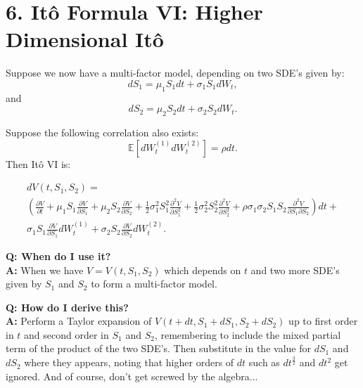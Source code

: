 \documentclass[11pt]{article}
\begin{document}
\newpage


\section*{6. Itô Formula VI: Higher Dimensional Itô}
Suppose we now have a multi-factor model, depending on two SDE's given by:
\begin{equation*}
        dS_1 = \mu_1 S_1 dt + \sigma_1 S_1 dW_t,
\end{equation*}
and
\begin{equation*}
        dS_2 = \mu_2 S_2 dt + \sigma_2 S_2 dW_t.
\end{equation*}

Suppose the following correlation also exists:
\begin{equation*}
    \mathbb{E} [dW_t^{(1)} dW_t^{(2)}] = \rho dt.
\end{equation*}
Then Itô VI is:

\begin{multline}
    dV(t,S_1,S_2) = \\ \left( \frac{\partial V}{\partial t} + \mu_1 S_1 \frac{\partial V}{\partial S_1} + \mu_2 S_2 \frac{\partial V}{\partial S_2} + \frac{1}{2} \sigma_1^{2} S_1^{2} \frac{\partial^{2} V}{\partial S_1^{2}} + \frac{1}{2} \sigma_2^{2} S_2^{2} \frac{\partial^{2} V}{\partial S_2^{2}} + \rho \sigma_1 \sigma_2 S_1 S_2 \frac{\partial^2 V}{\partial S_1 \partial S_2}\right) dt + \\ \sigma_1 S_1 \frac{\partial V}{\partial S_1} dW_t^{(1)} + \sigma_2 S_2 \frac{\partial V}{\partial S_2} dW_t^{(2)}.   
\end{multline}

\textbf{Q: When do I use it?} \\
\textbf{A:} When we have $V = V(t, S_1, S_2)$ which depends on $t$ and two more SDE's given by $S_1$ and $S_2$ to form a multi-factor model.

\textbf{Q: How do I derive this?} \\
\textbf{A:} Perform a Taylor expansion of $V(t+dt, S_1+dS_1, S_2 + dS_2)$ up to first order in $t$ and second order in $S_1$ and $S_2$, remembering to include the mixed partial term of the product of the two SDE's. Then substitute in the value for $dS_1$ and $dS_2$ where they appears, noting that higher orders of $dt$ such as $dt^{\frac{3}{2}}$ and $dt^2$ get ignored. And of course, don't get screwed by the algebra...
\end{document}
